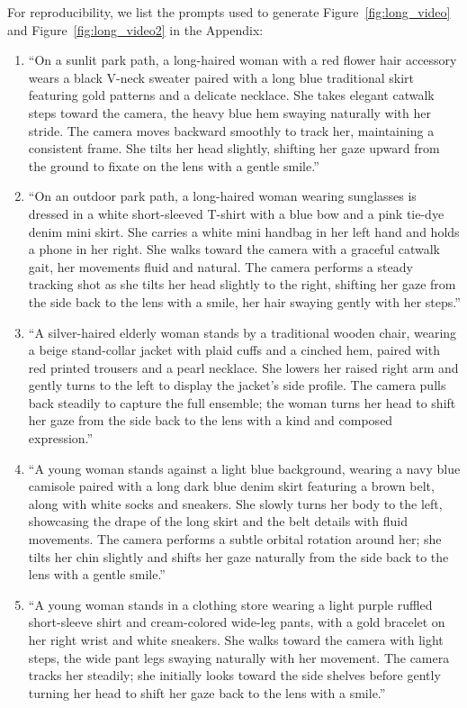 For reproducibility, we list the prompts used to generate Figure~\ref{fig:long_video} and Figure~\ref{fig:long_video2} in the Appendix:
\begin{enumerate}
\item ``On a sunlit park path, a long-haired woman with a red flower hair accessory wears a black V-neck sweater paired with a long blue traditional skirt featuring gold patterns and a delicate necklace. She takes elegant catwalk steps toward the camera, the heavy blue hem swaying naturally with her stride. The camera moves backward smoothly to track her, maintaining a consistent frame. She tilts her head slightly, shifting her gaze upward from the ground to fixate on the lens with a gentle smile.''
% 
\item ``On an outdoor park path, a long-haired woman wearing sunglasses is dressed in a white short-sleeved T-shirt with a blue bow and a pink tie-dye denim mini skirt. She carries a white mini handbag in her left hand and holds a phone in her right. She walks toward the camera with a graceful catwalk gait, her movements fluid and natural. The camera performs a steady tracking shot as she tilts her head slightly to the right, shifting her gaze from the side back to the lens with a smile, her hair swaying gently with her steps.''
% 
\item ``A silver-haired elderly woman stands by a traditional wooden chair, wearing a beige stand-collar jacket with plaid cuffs and a cinched hem, paired with red printed trousers and a pearl necklace. She lowers her raised right arm and gently turns to the left to display the jacket's side profile. The camera pulls back steadily to capture the full ensemble; the woman turns her head to shift her gaze from the side back to the lens with a kind and composed expression.''
% 
\item ``A young woman stands against a light blue background, wearing a navy blue camisole paired with a long dark blue denim skirt featuring a brown belt, along with white socks and sneakers. She slowly turns her body to the left, showcasing the drape of the long skirt and the belt details with fluid movements. The camera performs a subtle orbital rotation around her; she tilts her chin slightly and shifts her gaze naturally from the side back to the lens with a gentle smile.''
\item ``A young woman stands in a clothing store wearing a light purple ruffled short-sleeve shirt and cream-colored wide-leg pants, with a gold bracelet on her right wrist and white sneakers. She walks toward the camera with light steps, the wide pant legs swaying naturally with her movement. The camera tracks her steadily; she initially looks toward the side shelves before gently turning her head to shift her gaze back to the lens with a smile.''

\end{enumerate}
